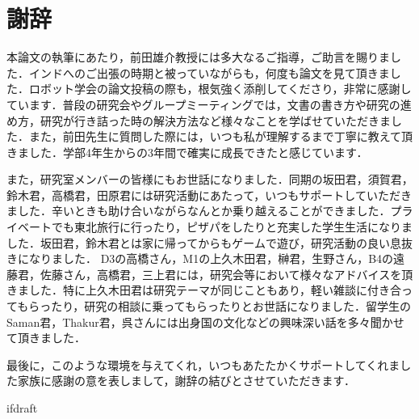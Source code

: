 \documentclass[a4paper,twoside,12pt,papersize, dvipdfmx]{iirthesis}
\begin{document}
\fi

\chapter{謝辞}\label{chapter:acknowledgements}
本論文の執筆にあたり，前田雄介教授には多大なるご指導，ご助言を賜りました．インドへのご出張の時期と被っていながらも，何度も論文を見て頂きました．ロボット学会の論文投稿の際も，根気強く添削してくださり，非常に感謝しています．普段の研究会やグループミーティングでは，文書の書き方や研究の進め方，研究が行き詰った時の解決方法など様々なことを学ばせていただきました．また，前田先生に質問した際には，いつも私が理解するまで丁寧に教えて頂きました．学部4年生からの3年間で確実に成長できたと感じています．\par
また，研究室メンバーの皆様にもお世話になりました．同期の坂田君，須賀君，鈴木君，高橋君，田原君には研究活動にあたって，いつもサポートしていただきました．辛いときも助け合いながらなんとか乗り越えることができました．プライベートでも東北旅行に行ったり，ピザパをしたりと充実した学生生活になりました．坂田君，鈴木君とは家に帰ってからもゲームで遊び，研究活動の良い息抜きになりました．
D3の高橋さん，M1の上久木田君，榊君，生野さん，B4の遠藤君，佐藤さん，高橋君，三上君には，研究会等において様々なアドバイスを頂きました．特に上久木田君は研究テーマが同じこともあり，軽い雑談に付き合ってもらったり，研究の相談に乗ってもらったりとお世話になりました．留学生のSaman君，Thakur君，呉さんには出身国の文化などの興味深い話を多々聞かせて頂きました．\par
最後に，このような環境を与えてくれ，いつもあたたかくサポートしてくれました家族に感謝の意を表しまして，謝辞の結びとさせていただきます．


\expandafter\ifx\csname ifdraft\endcsname\relax
  
\end{document}

